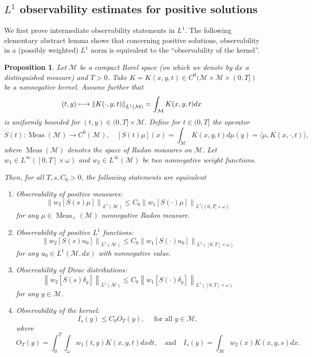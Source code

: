 \documentclass[JEP,XML,SOM,Unicode]{cedram}
\newcommand\mto{\mathchoice{\longmapsto}{\mapsto}{\mapsto}{\mapsto}}
\newtheorem{proposition}[lemma]{Proposition}
\theoremstyle{definition}
\newcommand{\M}{\ensuremath{\mathcal M}}
\DeclareMathOperator{\Meas}{Meas}
\newcommand\nor[2]{\left\|#1\right\|_{#2}}
\begin{document}
\subsection{$L^1$ observability estimates for positive solutions}
\label{s:L1obs}
We first prove intermediate observability statements in $L^1$.
The following elementary abstract lemma shows that concerning positive solutions, observability in a (possibly weighted) $L^1$ norm is equivalent to the ``observability of the kernel''.
\begin{proposition}
\label{propequivobsKernel}
Let $\M$ be a compact Borel space (on which we denote by $dx$ a distinguished measure) and $T>0$. Take $K =K(x,y,t) \in C^0( \M \times \M\times(0,T] )$ be a nonnegative kernel. Assume further that
\[
(t,y) \mto \nor{K(\cdot,y,t)}{L^1(\M)} = \int_\M K(x,y,t) dx
\]
is uniformly bounded for $(t,y)\in (0,T] \times \M$.
Define for $t\in (0,T]$ the operator
\[
S(t) : \Meas(\M) \to C^0(\M), \quad
\left[S(t)\mu \right](x)=\int_{\M} K(x,y,t)d\mu(y) = \langle \mu, K(x,\cdot,t) \rangle,
\]
where $\Meas(\M)$ denotes the space of Radon measures on $\M$.
Let $w_1\in L^{\infty}([0,T]\times \omega)$ and $w_2\in L^{\infty}(\M)$ be two nonnegative weight functions.

Then, for all $T, s,C_0>0$, the following statements are equivalent
\begin{enumerate}
\item \label{enumObsmeasure}Observability of positive measures:
\begin{equation}
\label{e:meas-mu-obs}
\nor{w_2 \left[S(s)\mu\right]}{L^1(\M)}\leq C_0 \nor{w_1 [S(\cdot)\mu]}{L^1((0,T]\times\omega)}
\end{equation}
for any $\mu \in \Meas_+(\M)$ nonnegative Radon measure.
\item \label{enumObsL1} Observability of positive $L^1$ functions:
\[
\nor{w_2 \left[S(s)u_0\right]}{L^1(\M)}\leq C_0 \nor{w_1\left[S(\cdot)u_0\right]}{L^1([0,T]\times \omega)}
\]
for any $u_0\in L^1(\M, dx)$ with nonnegative value.
\item \label{enumObsDirac}Observability of Dirac distributions:
\[
\nor{w_2 \left[S(s) \delta_y \right]}{L^1(\M)}\leq C_0 \nor{w_1 \left[S(\cdot) \delta_y \right]}{L^1([0,T]\times \omega)}
\]
for any $y\in \M$.
\item \label{enumObsKernel}Observability of the kernel:
\[
I_s (y)\leq C_0 O_T(y), \quad \text{ for all } y \in \M,
\]
where
\[
O_T(y)=\int_0^T \int_{\omega} w_1(t,y)K(x,y,t)dx dt, \quad \text{and} \quad
I_s (y)=\int_{\M} w_2(x)K(x,y,s)dx.
\]
\end{enumerate}
\end{proposition}
\end{document}
